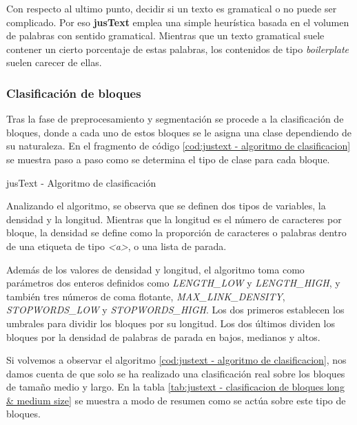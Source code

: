 Con respecto al ultimo punto, decidir si un texto es gramatical o no puede ser complicado. Por eso
\textbf{jusText} emplea una simple heurística basada en el volumen de palabras con sentido gramatical. 
Mientras que un texto gramatical suele contener un cierto porcentaje de estas palabras, los contenidos de 
tipo \emph{boilerplate} suelen carecer de ellas.

\subsubsection{Clasificación de bloques}
\label{subsubsec:clasificacion de bloques}

Tras la fase de preprocesamiento y segmentación se procede a la clasificación de bloques, donde a cada uno
de estos bloques se le asigna una clase dependiendo de su naturaleza. En el fragmento de código 
\ref{cod:justext - algoritmo de clasificacion} se muestra paso a paso como se determina el tipo de clase 
para cada bloque.

\begin{codefloat}
  
  \caption{jusText - Algoritmo de clasificación}
  \label{cod:justext - algoritmo de clasificacion}
\end{codefloat}

Analizando el algoritmo, se observa que se definen dos tipos de variables, la densidad y la longitud. 
Mientras que la longitud es el número de caracteres por bloque, la densidad se define como la proporción 
de caracteres o palabras dentro de una etiqueta de tipo \emph{<a>}, o una lista de parada.

Además de los valores de densidad y longitud, el algoritmo toma como parámetros dos enteros definidos como
\emph{LENGTH\_LOW} y \emph{LENGTH\_HIGH}, y también tres números de coma flotante, \emph{MAX\_LINK\_DENSITY},
\emph{STOPWORDS\_LOW} y \emph{STOPWORDS\_HIGH}. Los dos primeros establecen los umbrales para dividir los 
bloques por su longitud. Los dos últimos dividen los bloques por la densidad de palabras de parada en bajos, 
medianos y altos.

Si volvemos a observar el algoritmo \ref{cod:justext - algoritmo de clasificacion}, nos damos cuenta de
que solo se ha realizado una clasificación real sobre los bloques de tamaño medio y largo. En la tabla
\ref{tab:justext - clasificacion de bloques long & medium size} se muestra a modo de resumen como se actúa 
sobre este tipo de bloques.

